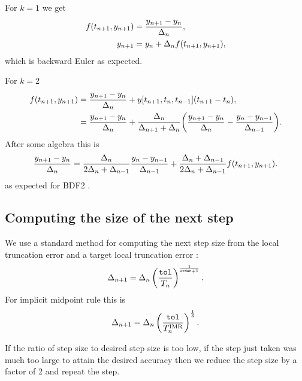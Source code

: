 For $k=1$ we get
\begin{equation}
  \begin{aligned}
    f(t_{n+1}, y_{n+1}) &= \frac{y_{n+1} - y_n}{\Delta_{n}}, \\
    y_{n+1} &= y_n + \Delta_{n} f(t_{n+1}, y_{n+1}),
  \end{aligned}
\end{equation}
which is backward Euler as expected.

For $k=2$
\begin{equation}
  \label{eqn:bdf2-derivation}
  \begin{aligned}
    f(t_{n+1}, y_{n+1}) &= \frac{y_{n+1} - y_n}{\Delta_{n}} +  y[t_{n+1}, t_{n}, t_{n-1}](t_{n+1} - t_n), \\
    &= \frac{y_{n+1} - y_n}{\Delta_{n}} +  \frac{\Delta_{n}}{\Delta_{n+1} + \Delta_{n}} {\left( \frac{y_{n+1} - y_n}{\Delta_{n}} - \frac{y_n - y_{n-1}}{\Delta_{n-1}} \right)}. \\
  \end{aligned}
\end{equation}
After some algebra this is
\begin{equation}
  \label{eqn:bdf2-derivation-rearranged}
  \begin{aligned}
    \frac{y_{n+1} - y_n}{\Delta_{n}} = \frac{\Delta_{n}}{2\Delta_{n} + \Delta_{n-1}} \frac{y_n - y_{n-1}}{\Delta_{n-1}} 
    + \frac{\Delta_{n} + \Delta_{n-1}}{2\Delta_{n} + \Delta_{n-1}} f(t_{n+1}, y_{n+1}).
  \end{aligned}
\end{equation}
as expected for BDF2 \cite[pg. 715]{GreshoSani}.


\subsection{Computing the size of the next step}

We use a standard method for computing the next step size from the local truncation error and a target local truncation error \toltt:\cite[pg.268]{Gresho-Sani}
\begin{equation}
\Delta_{n+1} = \Delta_{n} \left( \frac{{\textrm{\textup{\texttt{tol}}}}}{T_n}  \right) ^{\frac{1}{\texttt{order}+1}}.
\end{equation}
For implicit midpoint rule this is
\begin{equation}
  \Delta_{n+1} = \Delta_{n} \left( \frac{{\textrm{\textup{\texttt{tol}}}}}{T_n^{\text{IMR}}}  \right) ^{\frac{1}{3}}.
\end{equation}

If the ratio of step size to desired step size is too low, \ie if the step just taken was much too large to attain the desired accuracy then we reduce the step size by a factor of 2 and repeat the step.

